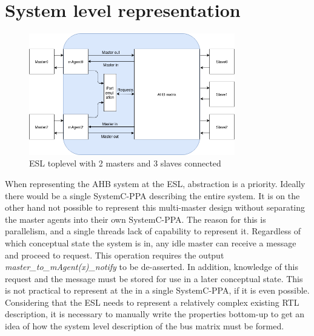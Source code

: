 \section{System level representation}
\label{sec:syslev}
\begin{figure}[hbt]
    \begin{center}
        \includegraphics[width=0.8\textwidth]{figs/ESL/Syslev.png}
    \end{center}
    \caption{ESL toplevel with 2 masters and 3 slaves connected}
    \label{fig:esl_toplev}
\end{figure}

When representing the AHB system at the ESL, abstraction is a priority. Ideally there would be a single SystemC-PPA describing the entire system. It is on 
the other hand not possible to represent this multi-master design without separating the master agents into their own SystemC-PPA. The reason for this is 
parallelism, and a single threads lack of capability to represent it. Regardless of which conceptual state the system is in, any idle master can receive 
a message and proceed to request. This operation requires the output \textit{master\_to\_mAgent(x)\_notify} to be de-asserted. In addition, knowledge of this request and the message must be stored for use in a later conceptual state. This is not practical to represent at the in a single SystemC-PPA, if it is even possible. \\
Considering that the ESL needs to represent a relatively complex existing RTL description, it is necessary to manually write the properties bottom-up to get an idea of how the system level description of the bus matrix must be formed.

